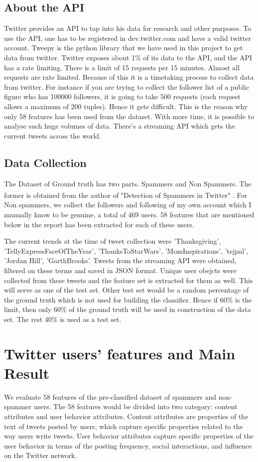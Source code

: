 \documentclass[11pt]{article}
\newcommand{\scite}[1]{\textsuperscript{\cite{#1}}} %
\begin{document}
\subsection{About the API}
Twitter provides an API to tap into his data for research and other purposes. To use the API, one has to be registered in dev.twitter.com and have a valid twitter account. Tweepy is the python library that we have used in this project to get data from twitter. Twitter exposes about 1\% of its data to the API, and the API has a rate limiting. There is a limit of 15 requests per 15 minutes. Almost all requests are rate limited. Because of this it is a timetaking process to collect data from twitter. For instance if you are trying to collect the follower list of a public figure who has 100000 followers, it is going to take 500 requests (each request allows a maximum of 200 tuples). Hence it gets difficult. This is the reason why only 58 features has been used from the dataset. With more time, it is possible to analyse such huge volumes of data. There's a streaming API which gets the current tweets across the world.

\subsection{Data Collection}
The Dataset of Ground truth has two parts. Spammers and Non Spammers. The former is obtained from the author of "Detection of Spammers in Twitter" \scite{1}. For Non spammers, we collect the followers and following of my own account which I manually know to be genuine, a total of 469 users. 58 features that are mentioned below in the report has been extracted for each of these users. 

The current trends at the time of tweet collection were 'Thanksgiving', 'TellyExpressFaceOfTheYear', 'ThanksToStarWars', 'MomInspirations', 'tejpal', 'Jordan Hill', 'GarthBrooks'. Tweets from the streaming API were obtained, filtered on these terms and saved in JSON format. Unique user obejcts were collected from these tweets and the feature set is extracted for them as well. This will serve as one of the test set. Other test set would be a random percentage of the ground truth which is not used for building the classifier. Hence if 60\% is the limit, then only 60\% of the ground truth will be used in construction of the data set. The rest 40\% is used as a test set. 

\section{Twitter users' features and Main Result}
We evaluate 58 features of the pre-classified dataset of spammers and non-spammer users. The 58 features would be divided into two category: content attributes and user behavior attributes. Content attributes are properties of the text of tweets posted by users, which capture specific properties related to the way users write tweets. User behavior attributes capture specific properties of the user behavior in terms of the posting frequency, social interactions, and influence on the Twitter network. 
\end{document}

